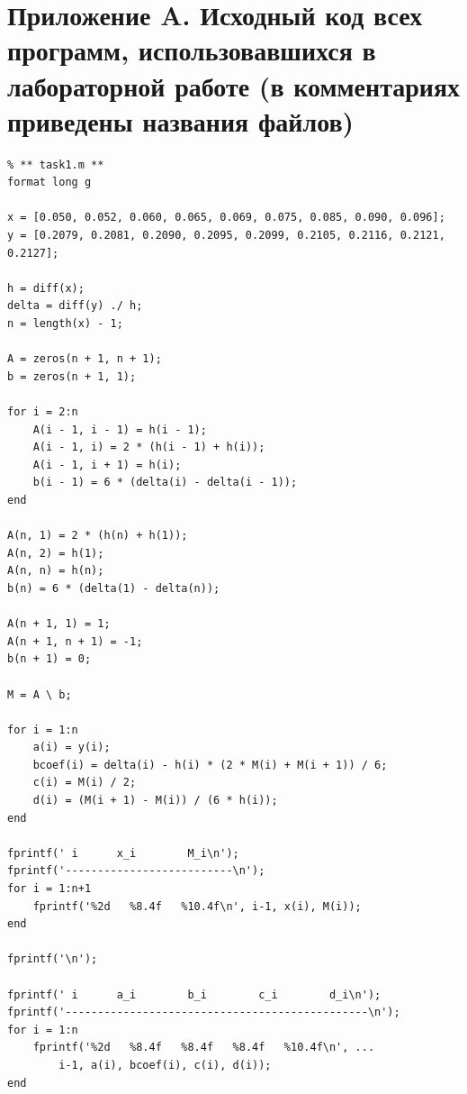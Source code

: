 \section*{Приложение A. Исходный код всех программ, использовавшихся в лабораторной работе (в комментариях приведены названия файлов)}

\renewcommand{\theFancyVerbLine}{%
    \scriptsize\ttfamily\textcolor{gray}{\arabic{FancyVerbLine}}%
}

\begin{verbatim}
% ** task1.m **
format long g

x = [0.050, 0.052, 0.060, 0.065, 0.069, 0.075, 0.085, 0.090, 0.096];
y = [0.2079, 0.2081, 0.2090, 0.2095, 0.2099, 0.2105, 0.2116, 0.2121, 0.2127];

h = diff(x);
delta = diff(y) ./ h;
n = length(x) - 1;

A = zeros(n + 1, n + 1);
b = zeros(n + 1, 1);

for i = 2:n
    A(i - 1, i - 1) = h(i - 1);
    A(i - 1, i) = 2 * (h(i - 1) + h(i));
    A(i - 1, i + 1) = h(i);
    b(i - 1) = 6 * (delta(i) - delta(i - 1));
end

A(n, 1) = 2 * (h(n) + h(1));
A(n, 2) = h(1);
A(n, n) = h(n);
b(n) = 6 * (delta(1) - delta(n));

A(n + 1, 1) = 1;
A(n + 1, n + 1) = -1;
b(n + 1) = 0;

M = A \ b;

for i = 1:n
    a(i) = y(i);
    bcoef(i) = delta(i) - h(i) * (2 * M(i) + M(i + 1)) / 6;
    c(i) = M(i) / 2;
    d(i) = (M(i + 1) - M(i)) / (6 * h(i));
end

fprintf(' i      x_i        M_i\n');
fprintf('--------------------------\n');
for i = 1:n+1
    fprintf('%2d   %8.4f   %10.4f\n', i-1, x(i), M(i));
end

fprintf('\n');

fprintf(' i      a_i        b_i        c_i        d_i\n');
fprintf('-----------------------------------------------\n');
for i = 1:n
    fprintf('%2d   %8.4f   %8.4f   %8.4f   %10.4f\n', ...
        i-1, a(i), bcoef(i), c(i), d(i));
end
\end{verbatim}
